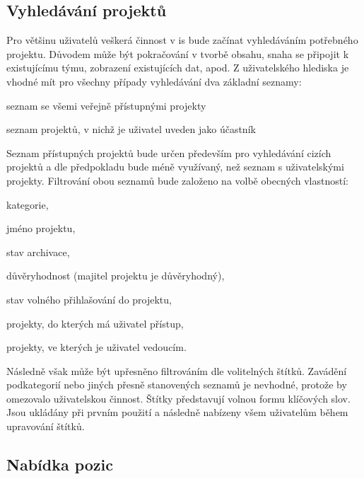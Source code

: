 \subsection{Vyhledávání projektů}

Pro většinu uživatelů veškerá činnost v \gls{is} bude začínat vyhledáváním potřebného projektu. Důvodem může být pokračování v tvorbě obsahu, snaha se připojit k existujícímu týmu, zobrazení existujících dat, apod. Z uživatelského hlediska je vhodné mít pro všechny případy vyhledávání dva základní seznamy:

\begin{ulnar}
   \item seznam se všemi veřejně přístupnými projekty
   \item seznam projektů, v nichž je uživatel uveden jako účastník
\end{ulnar}

Seznam přístupných projektů bude určen především pro vyhledávání cizích projektů a dle předpokladu bude méně využívaný, než seznam s uživatelskými projekty. Filtrování obou seznamů bude založeno na volbě obecných vlastností:

\begin{ulnar}
   \item kategorie,
   \item jméno projektu,
   \item stav archivace,
   \item důvěryhodnost (majitel projektu je důvěryhodný),
   \item stav volného přihlašování do projektu,
   \item projekty, do kterých má uživatel přístup,
   \item projekty, ve kterých je uživatel vedoucím.
\end{ulnar}

Následně však může být upřesněno filtrováním dle volitelných štítků. Zavádění podkategorií nebo jiných přesně stanovených seznamů je nevhodné, protože by omezovalo uživatelskou činnost. Štítky představují volnou formu klíčových slov. Jsou ukládány při prvním použití a následně nabízeny všem uživatelům během upravování štítků.





\subsection{Nabídka pozic}

